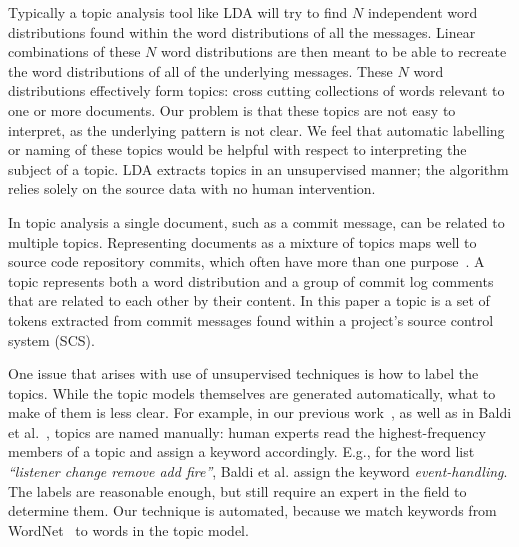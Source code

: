 \documentclass{acm_proc_article-sp}
\begin{document}
Typically a topic analysis tool like LDA will try to find $N$ independent word distributions found within the word distributions of all the messages. Linear combinations of these $N$ word distributions are then meant to be able to recreate the word distributions of all of the underlying messages. These $N$ word distributions effectively form topics: cross cutting collections of words relevant to one or more documents. Our problem is that these topics are not easy to interpret, as the underlying pattern is not clear. We feel that automatic labelling or naming of these topics would be helpful with respect to interpreting the subject of a topic. LDA extracts topics in an unsupervised manner; the algorithm relies solely on the source data with no human intervention.

In topic analysis a single document, such as a commit message, can be related to multiple topics. Representing documents as a mixture of topics maps well to source code repository commits, which often have more than one purpose~\cite{Hindle09ICSM}.  A topic represents both a word distribution and a group of commit log comments that are related to each other by their content.  In this paper a topic is a set of tokens extracted from commit messages found within a project's source control system (SCS).

One issue that arises with use of unsupervised techniques is how to label the topics. While the topic models themselves are generated automatically, what to make of them is less clear. For example, in our previous work~\cite{Hindle09ICSM}, as well as in Baldi et al.~\cite{Baldi2008}, topics are named manually: human experts read the highest-frequency members of a topic and assign a keyword accordingly. E.g., for the word list \emph{``listener change remove add fire''}, Baldi et al. assign the keyword \emph{event-handling}. The labels are reasonable enough, but still require an expert in the field to determine them. Our technique is automated, because we match keywords from WordNet~\cite{Fellbaum1998} to words in the topic model. 
\end{document}
